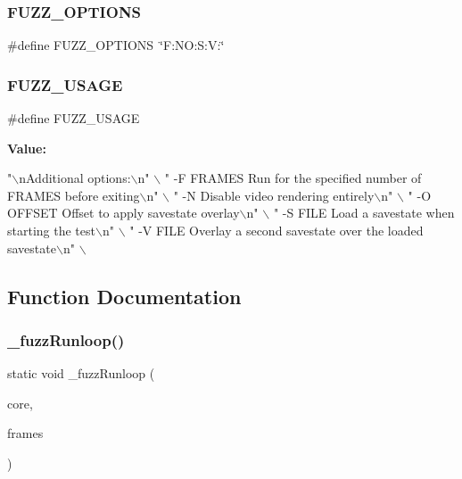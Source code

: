 \subsubsection{\texorpdfstring{F\+U\+Z\+Z\+\_\+\+O\+P\+T\+I\+O\+NS}{FUZZ\_OPTIONS}}
{\footnotesize\ttfamily \#define F\+U\+Z\+Z\+\_\+\+O\+P\+T\+I\+O\+NS~\char`\"{}F\+:\+N\+O\+:\+S\+:\+V\+:\char`\"{}}

\mbox{\label{fuzz-main_8c_ab48c3f60c1385a1a52801d32023d7584}} 
\subsubsection{\texorpdfstring{F\+U\+Z\+Z\+\_\+\+U\+S\+A\+GE}{FUZZ\_USAGE}}
{\footnotesize\ttfamily \#define F\+U\+Z\+Z\+\_\+\+U\+S\+A\+GE}

{\bfseries Value\+:}
\begin{DoxyCode}
\textcolor{stringliteral}{"\(\backslash\)nAdditional options:\(\backslash\)n"} \(\backslash\)
    \textcolor{stringliteral}{"  -F FRAMES        Run for the specified number of FRAMES before exiting\(\backslash\)n"} \(\backslash\)
    \textcolor{stringliteral}{"  -N               Disable video rendering entirely\(\backslash\)n"} \(\backslash\)
    \textcolor{stringliteral}{"  -O OFFSET        Offset to apply savestate overlay\(\backslash\)n"} \(\backslash\)
    \textcolor{stringliteral}{"  -S FILE          Load a savestate when starting the test\(\backslash\)n"} \(\backslash\)
    \textcolor{stringliteral}{"  -V FILE          Overlay a second savestate over the loaded savestate\(\backslash\)n"} \(\backslash\)
\end{DoxyCode}


\subsection{Function Documentation}
\mbox{\label{fuzz-main_8c_a2d0278ae741941374e0465b15af47d1d}} 
\subsubsection{\texorpdfstring{\+\_\+fuzz\+Runloop()}{\_fuzzRunloop()}}
{\footnotesize\ttfamily static void \+\_\+fuzz\+Runloop (\begin{DoxyParamCaption}\item[{struct m\+Core $\ast$}]{core,  }\item[{\mbox{\hyperlink{ioapi_8h_a787fa3cf048117ba7123753c1e74fcd6}{int}}}]{frames }\end{DoxyParamCaption})\hspace{0.3cm}{\ttfamily [static]}}

